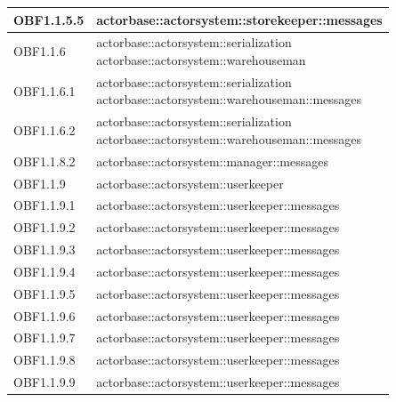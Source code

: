 \documentclass{scalatekids-article}
\begin{document}
\begin{longtable}[H]{|p{3.5cm}|p{7.5cm}|}
\hline
OBF1.1.5.5 & \multiLineCell[t]{actorbase::actorsystem::storekeeper::messages\\}\\
\hline
OBF1.1.6 & \multiLineCell[t]{actorbase::actorsystem::serialization\\actorbase::actorsystem::warehouseman\\}\\
\hline
OBF1.1.6.1 & \multiLineCell[t]{actorbase::actorsystem::serialization\\actorbase::actorsystem::warehouseman::messages\\}\\
\hline
OBF1.1.6.2 & \multiLineCell[t]{actorbase::actorsystem::serialization\\actorbase::actorsystem::warehouseman::messages\\}\\
\hline
OBF1.1.8.2 & \multiLineCell[t]{actorbase::actorsystem::manager::messages\\}\\
\hline
OBF1.1.9 & \multiLineCell[t]{actorbase::actorsystem::userkeeper\\}\\
\hline
OBF1.1.9.1 & \multiLineCell[t]{actorbase::actorsystem::userkeeper::messages\\}\\
\hline
OBF1.1.9.2 & \multiLineCell[t]{actorbase::actorsystem::userkeeper::messages\\}\\
\hline
OBF1.1.9.3 & \multiLineCell[t]{actorbase::actorsystem::userkeeper::messages\\}\\
\hline
OBF1.1.9.4 & \multiLineCell[t]{actorbase::actorsystem::userkeeper::messages\\}\\
\hline
OBF1.1.9.5 & \multiLineCell[t]{actorbase::actorsystem::userkeeper::messages\\}\\
\hline
OBF1.1.9.6 & \multiLineCell[t]{actorbase::actorsystem::userkeeper::messages\\}\\
\hline
OBF1.1.9.7 & \multiLineCell[t]{actorbase::actorsystem::userkeeper::messages\\}\\
\hline
OBF1.1.9.8 & \multiLineCell[t]{actorbase::actorsystem::userkeeper::messages\\}\\
\hline
OBF1.1.9.9 & \multiLineCell[t]{actorbase::actorsystem::userkeeper::messages\\}\\

\end{longtable}
\end{document}
